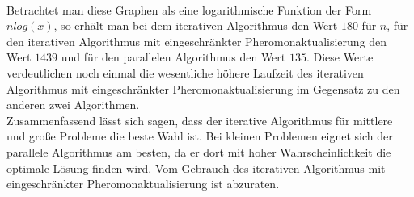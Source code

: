 \documentclass[doktyp=barbeit, sprache=german]{TUBAFarbeiten}
\begin{document}
\\Betrachtet man diese Graphen als eine logarithmische Funktion der Form $n log(x)$, so erhält man bei dem iterativen Algorithmus den Wert $180$ für $n$, für den iterativen Algorithmus mit eingeschränkter Pheromonaktualisierung den Wert $1439$ und für den parallelen Algorithmus den Wert $135$. Diese Werte verdeutlichen noch einmal die wesentliche höhere Laufzeit des iterativen Algorithmus mit eingeschränkter Pheromonaktualisierung im Gegensatz zu den anderen zwei Algorithmen.
\\Zusammenfassend lässt sich sagen, dass der iterative Algorithmus für mittlere und große Probleme die beste Wahl ist. Bei kleinen Problemen eignet sich der parallele Algorithmus am besten, da er dort mit hoher Wahrscheinlichkeit die optimale Lösung finden wird. Vom Gebrauch des iterativen Algorithmus mit eingeschränkter Pheromonaktualisierung ist abzuraten.
\end{document}
